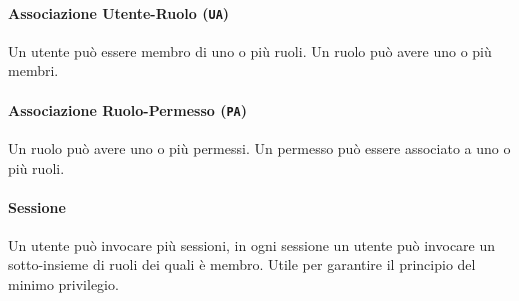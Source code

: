             \paragraph{Associazione Utente-Ruolo (\texttt{UA})} Un utente può essere membro di uno o più ruoli. Un ruolo può avere uno o più membri.
            \paragraph{Associazione Ruolo-Permesso (\texttt{PA})} Un ruolo può avere uno o più permessi. Un permesso può essere associato a uno o più ruoli.
            \paragraph{Sessione} Un utente può invocare più sessioni, in ogni sessione un utente può invocare un sotto-insieme di ruoli dei quali è membro. Utile per garantire il principio del minimo privilegio.